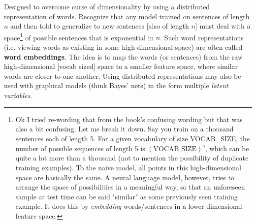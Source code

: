 \documentclass[11pt]{article}
\begin{document}

\p Designed to overcome curse of dimensionality by using a distributed representation of words. Recognize that any model trained on sentences of length $n$ and then told to generalize to new sentences [also of length $n$] must deal with a space\footnote{Ok I tried re-wording that from the book's confusing wording but that was also a bit confusing. Let me break it down. Say you train on a thousand sentences each of length 5. For a given vocabulary of size VOCAB\_SIZE, the number of possible sequences of length 5 is $(\text{VOCAB\_SIZE})^5$, which can be quite a lot more than a thousand (not to mention the possibility of duplicate training examples). To the naive model, all points in this high-dimensional space are basically the same. A neural language model, however, tries to arrange the space of possibilities in a meaningful way, so that an unforeseen sample at test time can be said "similar" as some previously seen training example. It does this by \textit{embedding} words/sentences in a lower-dimensional feature space.} of possible sentences that is exponential in $n$. Such word representations (i.e. viewing words as existing in some high-dimensional space) are often called \textbf{word embeddings}. The idea is to map the words (or sentences) from the raw high-dimensional [vocab sized] space to a smaller feature space, where similar words are closer to one another. Using distributed representations may also be used with graphical models (think Bayes' nets) in the form multiple \textit{latent variables}. 










\label{Deep Learning Research}

\end{document}
